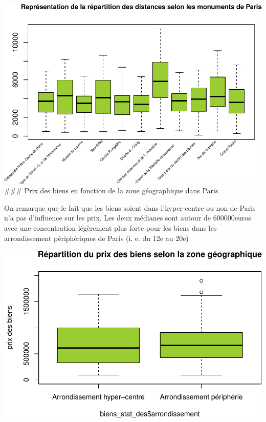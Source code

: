 \documentclass[french,]{article}
\newenvironment{Shaded}{\begin{snugshade}}{\end{snugshade}}
\newcommand{\CommentTok}[1]{\textcolor[rgb]{0.56,0.35,0.01}{\textit{#1}}}
\newcommand{\DataTypeTok}[1]{\textcolor[rgb]{0.13,0.29,0.53}{#1}}
\newcommand{\DecValTok}[1]{\textcolor[rgb]{0.00,0.00,0.81}{#1}}
\newcommand{\KeywordTok}[1]{\textcolor[rgb]{0.13,0.29,0.53}{\textbf{#1}}}
\newcommand{\NormalTok}[1]{#1}
\newcommand{\OperatorTok}[1]{\textcolor[rgb]{0.81,0.36,0.00}{\textbf{#1}}}
\newcommand{\StringTok}[1]{\textcolor[rgb]{0.31,0.60,0.02}{#1}}
\begin{document}
\includegraphics{Projet_files/figure-latex/unnamed-chunk-23-1.pdf}
\#\#\# Prix des biens en fonction de la zone géographique dans Paris

On remarque que le fait que les biens soient dans l'hyper-centre ou non
de Paris n'a pas d'influence sur les prix. Les deux médianes sont autour
de 600000euros avec une concentration légèrement plus forte pour les
biens dans les arrondissement périphériques de Paris (i. e. du 12e au
20e)

\begin{Shaded}
\end{Shaded}

\includegraphics{Projet_files/figure-latex/unnamed-chunk-24-1.pdf}
\end{document}

